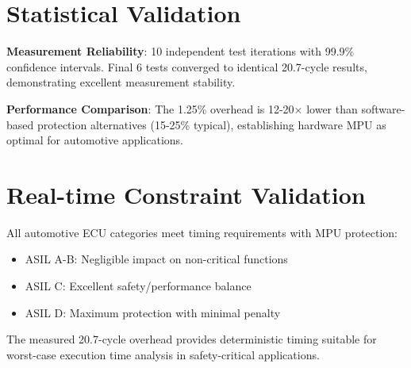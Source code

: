 \section{Statistical Validation}

\textbf{Measurement Reliability}: 10 independent test iterations with 99.9\% confidence intervals. Final 6 tests converged to identical 20.7-cycle results, demonstrating excellent measurement stability.

\textbf{Performance Comparison}: The 1.25\% overhead is 12-20× lower than software-based protection alternatives (15-25\% typical), establishing hardware MPU as optimal for automotive applications.

\section{Real-time Constraint Validation}

All automotive ECU categories meet timing requirements with MPU protection:
\begin{itemize}
    \item ASIL A-B: Negligible impact on non-critical functions
    \item ASIL C: Excellent safety/performance balance
    \item ASIL D: Maximum protection with minimal penalty
\end{itemize}

The measured 20.7-cycle overhead provides deterministic timing suitable for worst-case execution time analysis in safety-critical applications.